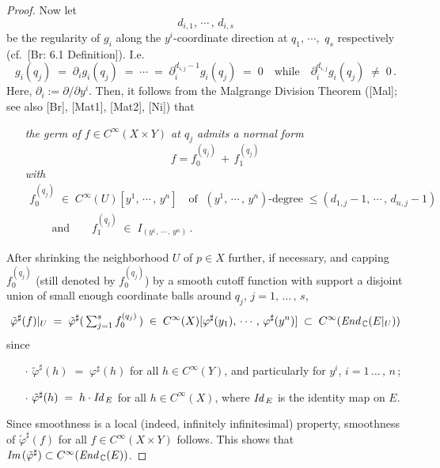 \documentclass[11pt]{article}
\numberwithin{equation}{subsection}
\newcommand{\End}{\mbox{\it End}\,}
\newcommand{\Id}{\mbox{\it Id}\,}
\newcommand{\Image}{\mbox{\it Im}\,}
\begin{document}
\begin{proof}
  Now let
  $$
    d_{i,1},\,\cdots\,,\,  d_{i,s}
  $$
  be the regularity of $g_i$ along the $y^i$-coordinate direction at $q_1,\,\cdots,\,\, q_s$ respectively
  (cf.\ [Br: 6.1 Definition]).
  I.e.\
  $$
    g_i(q_j)\;=\; \partial_ig_i(q_j) \; =\; \cdots\;
	 =\; \partial_i^{d_{i,j}-1}g_i(q_j)\;=\; 0
	\hspace{1em}\mbox{while}\hspace{1em}
	\partial_i^{d_{i,j}}g_i(q_j)\;\ne \; 0\,.	
  $$
  Here, $\partial_i := \partial/\partial y^i$.
 Then, it follows from the Malgrange Division Theorem ([Mal]; see also [Br], [Mat1], [Mat2], [Ni]) that
  \begin{itemize}
    \item[]\it
    the germ of $f\in C^{\infty}(X\times Y)$ at $q_j$ admits a normal form
	 $$
	    f= f_0^{(q_j)}\,+\, f_1^{(q_j)}
	 $$
	with
	 $$
	  \begin{array}{c}
	    f_0^{(q_j)}\; \in\; C^{\infty}(U)[y^1,\,\cdots\,,\, y^n]
        \hspace{1em}\mbox{of $\;(y^1,\,\cdots\,,\,y^n)$-degree}\;
        \le(d_{1,j}-1,\,\cdots\,,\, d_{n,j}-1)\\[2ex]
       \hspace{2em}\mbox{and}\hspace{2em}
       f_1^{(q_j)}\;\in \; I_{(y^1,\,\cdots\,,\,y^n)}\,. \hspace{5em}	   		
	  \end{array}
	 $$
  \end{itemize}
 After
   shrinking the neighborhood $U$ of $p\in X$ further, if necessary,  and
   capping $f_0^{(q_j)}$ (still denoted by $f_0^{(q_j)}$)
  by a smooth cutoff function with support a disjoint union of small enough coordinate balls
  around $q_j$, $j=1,\,\ldots\,,\,s$,
 $$
  \tilde{\varphi}^{\sharp}(f)|_{U}\;
   =\;   \tilde{\varphi}^{\sharp}(\,\mbox{$\sum_{j=1}^s f_0^{(q_j)}$}\,)\;
   \in\; C^{\infty}(X)[\varphi^{\sharp}(y_1),\,\cdots\,,\, \varphi^{\sharp}(y^n)]\;
   \subset\; C^{\infty}(\End_{\Bbb C}(E|_U))
 $$
 since
   \begin{itemize}
    \item[\LARGE $\cdot$]
	 $\tilde{\varphi}^{\sharp}(h)\;=\; \varphi^{\sharp}(h) $ for all $h\in C^{\infty}(Y)$,
	   and particularly for $y^i$, $i=1\,\ldots\,,\,n\,$;
	\item[\LARGE $\cdot$]
	 $\tilde{\varphi}^{\sharp}(h)\;=\; h\cdot \Id_{E}$ for all $h\in C^{\infty}(X)$,
	  where $\Id_E$ is the identity map on $E$.
   \end{itemize}
 Since smoothness is a local (indeed, infinitely infinitesimal) property, 	
   smoothness of $\tilde{\varphi}^{\sharp}(f)$  for all $f\in C^{\infty}(X\times Y)$
   follows.
 This shows that
	 $\Image(\tilde{\varphi}^{\sharp})\subset C^{\infty}(\End_{\Bbb C}(E))$.


\end{proof}
\end{document}
